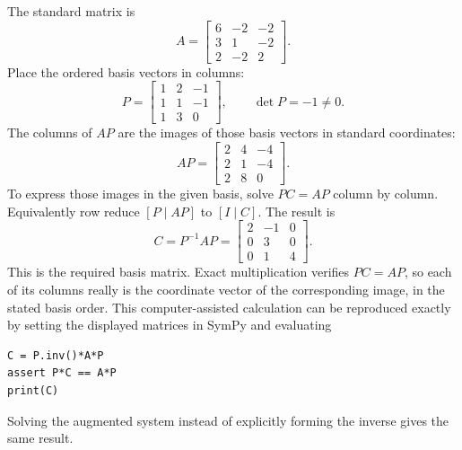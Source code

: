 The standard matrix is
\[A=\begin{bmatrix}6&-2&-2\\3&1&-2\\2&-2&2\end{bmatrix}.\]
Place the ordered basis vectors in columns:
\[P=\begin{bmatrix}1&2&-1\\1&1&-1\\1&3&0\end{bmatrix},\qquad\det P=-1\ne0.\]
The columns of $AP$ are the images of those basis vectors in standard coordinates:
\[AP=\begin{bmatrix}2&4&-4\\2&1&-4\\2&8&0\end{bmatrix}.\]
To express those images in the given basis, solve $PC=AP$ column by column. Equivalently row reduce $[P\mid AP]$ to $[I\mid C]$. The result is
\[C=P^{-1}AP=\begin{bmatrix}2&-1&0\\0&3&0\\0&1&4\end{bmatrix}.\]
This is the required basis matrix. Exact multiplication verifies $PC=AP$, so each of its columns really is the coordinate vector of the corresponding image, in the stated basis order.
This computer-assisted calculation can be reproduced exactly by setting the displayed matrices in SymPy and evaluating
\begin{verbatim}
C = P.inv()*A*P
assert P*C == A*P
print(C)
\end{verbatim}
Solving the augmented system instead of explicitly forming the inverse gives the same result.

